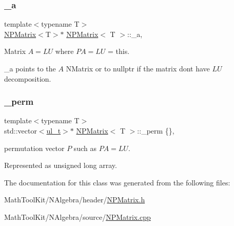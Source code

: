 \subsubsection{\texorpdfstring{\_a}{\_a}}
{\footnotesize\ttfamily template$<$typename T$>$ \\
\mbox{\hyperlink{class_n_p_matrix}{N\+P\+Matrix}}$<$T$>$$\ast$ \mbox{\hyperlink{class_n_p_matrix}{N\+P\+Matrix}}$<$ T $>$\+::\+\_\+a\hspace{0.3cm}{\ttfamily [mutable]}, {\ttfamily [protected]}}



Matrix $ A = LU $ where $ PA = LU $ = this. 

{\ttfamily \+\_\+a} points to the $ A $ N\+Matrix or to {\ttfamily nullptr} if the matrix don\textquotesingle{}t have $ LU $ decomposition. \mbox{\label{class_n_p_matrix_adae969b094e97895a62412765b50fb6f}} 
\subsubsection{\texorpdfstring{\_perm}{\_perm}}
{\footnotesize\ttfamily template$<$typename T$>$ \\
std\+::vector$<$\mbox{\hyperlink{group___n_algebra_ga1b140a2034db3f5dfe18a987745df43a}{ul\+\_\+t}}$>$$\ast$ \mbox{\hyperlink{class_n_p_matrix}{N\+P\+Matrix}}$<$ T $>$\+::\+\_\+perm \{\}\hspace{0.3cm}{\ttfamily [mutable]}, {\ttfamily [protected]}}



permutation vector $ P $ such as $ PA = LU $. 

Represented as {\ttfamily unsigned long} array. 

The documentation for this class was generated from the following files\+:\begin{DoxyCompactItemize}
\item 
Math\+Tool\+Kit/\+N\+Algebra/header/\mbox{\hyperlink{_n_p_matrix_8h}{N\+P\+Matrix.\+h}}\item 
Math\+Tool\+Kit/\+N\+Algebra/source/\mbox{\hyperlink{_n_p_matrix_8cpp}{N\+P\+Matrix.\+cpp}}\end{DoxyCompactItemize}
